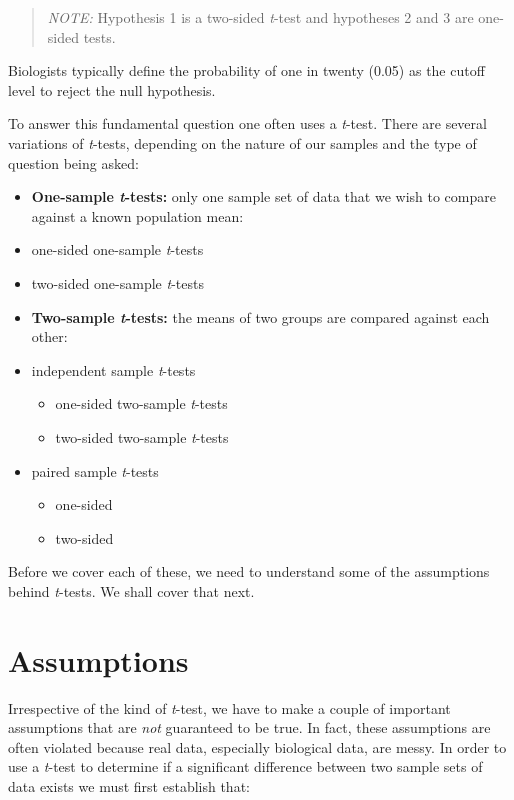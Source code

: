 \documentclass[english,10pt,a4paper,oneside]{book}
\providecommand{\tightlist}{%
  \setlength{\itemsep}{0pt}\setlength{\parskip}{0pt}}
\theoremstyle{definition}
\theoremstyle{definition}
\theoremstyle{definition}
\theoremstyle{remark}
\begin{document}
\begin{quote}
\emph{NOTE:} Hypothesis 1 is a two-sided \emph{t}-test and hypotheses 2
and 3 are one-sided tests.
\end{quote}

Biologists typically define the probability of one in twenty (0.05) as
the cutoff level to reject the null hypothesis.

To answer this fundamental question one often uses a \emph{t}-test.
There are several variations of \emph{t}-tests, depending on the nature
of our samples and the type of question being asked:

\begin{itemize}
\tightlist
\item
  \textbf{One-sample \emph{t}-tests:} only one sample set of data that
  we wish to compare against a known population mean:
\item
  one-sided one-sample \emph{t}-tests
\item
  two-sided one-sample \emph{t}-tests
\item
  \textbf{Two-sample \emph{t}-tests:} the means of two groups are
  compared against each other:
\item
  independent sample \emph{t}-tests

  \begin{itemize}
  \tightlist
  \item
    one-sided two-sample \emph{t}-tests
  \item
    two-sided two-sample \emph{t}-tests
  \end{itemize}
\item
  paired sample \emph{t}-tests

  \begin{itemize}
  \tightlist
  \item
    one-sided
  \item
    two-sided
  \end{itemize}
\end{itemize}

Before we cover each of these, we need to understand some of the
assumptions behind \emph{t}-tests. We shall cover that next.

\section{Assumptions}\label{assumptions}

Irrespective of the kind of \emph{t}-test, we have to make a couple of
important assumptions that are \emph{not} guaranteed to be true. In
fact, these assumptions are often violated because real data, especially
biological data, are messy. In order to use a \emph{t}-test to determine
if a significant difference between two sample sets of data exists we
must first establish that:
\end{document}
